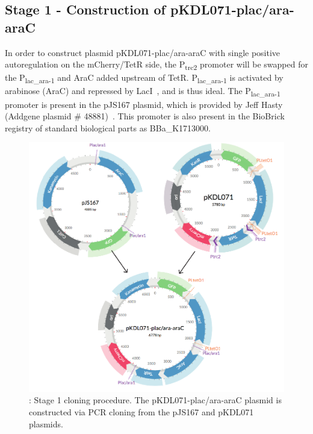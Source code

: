 \subsection{Stage 1 - Construction of pKDL071-plac/ara-araC}

In order to construct plasmid pKDL071-plac/ara-araC with single positive autoregulation on the mCherry/TetR side, the P\textsubscript{trc2} promoter will be swapped for the P\textsubscript{lac\_ara-1} and AraC added upstream of TetR. P\textsubscript{lac\_ara-1} is activated by arabinose (AraC) and repressed by LacI~\autocite{Lutz:1997ti}, and is thus ideal. The P\textsubscript{lac\_ara-1} promoter is present in the pJS167 plasmid, which is provided by Jeff Hasty (Addgene plasmid \# 48881)~\autocite{Stricker:2008jqa}. This promoter is also present in the BioBrick registry of standard biological parts as BBa\_K1713000. 



\begin{figure}[t]
	\begin{center}
		\includegraphics[scale=0.7]{../../chapters/chapterDesignSwitches/images/stage1_cloning.pdf}
		\caption[Stage 1 cloning procedure.]{\label{fig:stage1}: Stage 1 cloning procedure. The pKDL071-plac/ara-araC plasmid is constructed via PCR cloning from the pJS167 and pKDL071 plasmids.}
	\end{center}
\end{figure}
\clearpage


